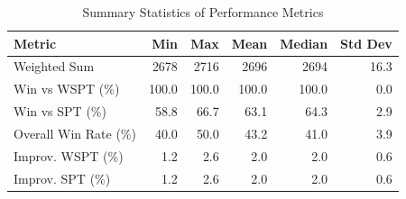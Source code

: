 \begin{table}[htbp]%
\centering%
\begin{tabular}{lrrrrr}%
\toprule%
\textbf{Metric}&\textbf{Min}&\textbf{Max}&\textbf{Mean}&\textbf{Median}&\textbf{Std Dev}\\%
\midrule%
Weighted Sum&2678&2716&2696&2694&16.3\\%
Win vs WSPT (\%)&100.0&100.0&100.0&100.0&0.0\\%
Win vs SPT (\%)&58.8&66.7&63.1&64.3&2.9\\%
Overall Win Rate (\%)&40.0&50.0&43.2&41.0&3.9\\%
Improv. WSPT (\%)&1.2&2.6&2.0&2.0&0.6\\%
Improv. SPT (\%)&1.2&2.6&2.0&2.0&0.6\\%
\bottomrule%
\end{tabular}%
\caption{Summary Statistics of Performance Metrics}%
\label{tab:metrics}%
\end{table}